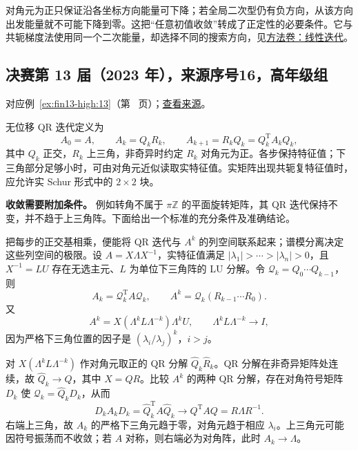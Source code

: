 \documentclass[12pt,fontset=fandol]{ctexart}
\begin{document}
\begin{remark}[方法与条件]

对角元为正只保证沿各坐标方向能量可下降；若全局二次型仍有负方向，从该方向出发能量就不可能下降到零。这把“任意初值收敛”转成了正定性的必要条件。它与共轭梯度法使用同一个二次能量，却选择不同的搜索方向，见\hyperref[app:linear-iteration]{方法卷：线性迭代}。

\end{remark}

\subsection{决赛第 13 届（2023 年），来源序号16，高年级组}\label{ans:fin13-high:13}\label{pr:fin13-high:13}

对应例~\ref{ex:fin13-high:13}（第~\pageref{ex:fin13-high:13} 页）；\href{https://github.com/lzxcr/cmc-mathematics/blob/64916fa1fdbc3e444a652eca204d5669058ee321/src/problems/finals/13/16.md}{查看来源}。

\begin{solve}

无位移 QR 迭代定义为
\[
A_0=A,\qquad A_k=Q_kR_k,\qquad A_{k+1}=R_kQ_k=Q_k^{\mathrm T}A_kQ_k,
\]
其中 $Q_k$ 正交，$R_k$ 上三角，非奇异时约定 $R_k$ 对角元为正。各步保持特征值；下三角部分足够小时，可由对角元近似读取实特征值。实矩阵出现共轭复特征值时，应允许实 Schur 形式中的 $2\times2$ 块。

\textbf{收敛需要附加条件。} 例如转角不属于 $\pi\mathbb Z$ 的平面旋转矩阵，其 QR 迭代保持不变，并不趋于上三角阵。下面给出一个标准的充分条件及准确结论。

把每步的正交基相乘，便能将 QR 迭代与 $A^k$ 的列空间联系起来；谱模分离决定这些列空间的极限。设 $A=X\Lambda X^{-1}$，实特征值满足 $|\lambda_1|>\cdots>|\lambda_n|>0$，且 $X^{-1}=LU$ 存在无选主元、$L$ 为单位下三角阵的 LU 分解。令 $\mathcal Q_k=Q_0\cdots Q_{k-1}$，则
\[
A_k=\mathcal Q_k^{\mathrm T}A\mathcal Q_k,\qquad
A^k=\mathcal Q_k(R_{k-1}\cdots R_0).
\]
又
\[
A^k=X(\Lambda^kL\Lambda^{-k})\Lambda^kU,
\qquad \Lambda^kL\Lambda^{-k}\longrightarrow I,
\]
因为严格下三角位置的因子是 $(\lambda_i/\lambda_j)^k$，$i>j$。

对 $X(\Lambda^kL\Lambda^{-k})$ 作对角元取正的 QR 分解 $\widehat Q_k\widehat R_k$。QR 分解在非奇异矩阵处连续，故 $\widehat Q_k\to Q$，其中 $X=QR$。比较 $A^k$ 的两种 QR 分解，存在对角符号矩阵 $D_k$ 使 $\mathcal Q_k=\widehat Q_kD_k$，从而
\[
D_kA_kD_k=\widehat Q_k^{\mathrm T}A\widehat Q_k
\longrightarrow Q^{\mathrm T}AQ=R\Lambda R^{-1}.
\]
右端上三角，故 $A_k$ 的严格下三角元趋于零，对角元趋于相应 $\lambda_i$。上三角元可能因符号振荡而不收敛；若 $A$ 对称，则右端必为对角阵，此时 $A_k\to\Lambda$。

\end{solve}
\end{document}
